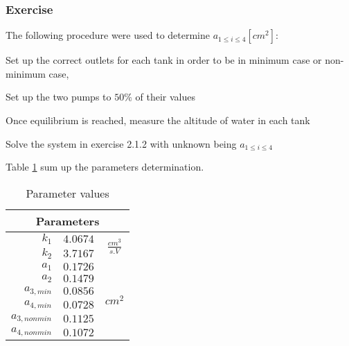 \subsubsection{Exercise} 

The following procedure were used to determine $a_{1\leq i \leq 4} \left[cm^2\right]$:

\begin{shortitemize}
    \item Set up the correct outlets for each tank in order to be in minimum case or non-minimum case,
    \item Set up the two pumps to $50\%$ of their values
    \item Once equilibrium is reached, measure the altitude of water in each tank
    \item Solve the system in exercise 2.1.2 with unknown being $a_{1\leq i \leq 4}$
\end{shortitemize}

Table \ref{parameterDetermination} sum up the parameters determination. 

\begin{table}[h!b]
    \centering
    \begin{tabular}{|r|l|c|}
        \hline
        \multicolumn{3}{|c|}{Parameters}\\
        \hline
        $k_1$           & $4.0674$ & \multirow{2}{*}{$\frac{cm^3}{s.V}$}  \\
        $k_2$           & $3.7167$  & \\
        \hline 
        $a_1$           & $0.1726$  & \multirow{6}{*}{$cm^2$}  \\
        $a_2$           & $0.1479$  & \\
        $a_{3,min}$     & $0.0856$  & \\
        $a_{4,min}$     & $0.0728$  & \\
        $a_{3,nonmin}$  & $0.1125$  & \\
        $a_{4,nonmin}$  & $0.1072$  & \\
        \hline
    \end{tabular}
    \caption{Parameter values}
    \label{parameterDetermination}
\end{table}
